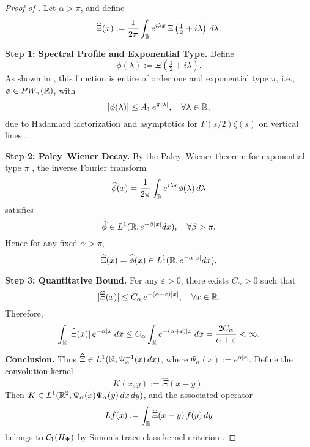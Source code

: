\begin{proof}[Proof of ]
Let \( \alpha > \pi \), and define
\[
\widehat{\Xi}(x) := \frac{1}{2\pi} \int_{\mathbb{R}} e^{i\lambda x} \, \Xi\left( \tfrac{1}{2} + i\lambda \right)\, d\lambda.
\]

\medskip
\noindent\textbf{Step 1: Spectral Profile and Exponential Type.}
Define
\[
\phi(\lambda) := \Xi\left( \tfrac{1}{2} + i\lambda \right).
\]
As shown in , this function is entire of order one and exponential type \( \pi \), i.e., \( \phi \in PW_\pi(\mathbb{R}) \), with
\[
|\phi(\lambda)| \le A_1\, e^{\pi |\lambda|}, \quad \forall \lambda \in \mathbb{R},
\]
due to Hadamard factorization and asymptotics for \( \Gamma(s/2)\zeta(s) \) on vertical lines \cite[Ch.~3]{Levin1996EntireLectures}, \cite[Ch.~2]{Titchmarsh1986Zeta}.

\medskip
\noindent\textbf{Step 2: Paley--Wiener Decay.}
By the Paley--Wiener theorem for exponential type \( \pi \) \cite[Thm.~3.2.4]{Levin1996EntireLectures}, the inverse Fourier transform
\[
\widehat{\phi}(x) = \frac{1}{2\pi} \int_{\mathbb{R}} e^{i\lambda x} \phi(\lambda)\, d\lambda
\]
satisfies
\[
\widehat{\phi} \in L^1(\mathbb{R}, e^{-\beta |x|} dx), \quad \forall \beta > \pi.
\]
Hence for any fixed \( \alpha > \pi \),
\[
\widehat{\Xi}(x) = \widehat{\phi}(x) \in L^1(\mathbb{R}, e^{-\alpha |x|} dx).
\]

\medskip
\noindent\textbf{Step 3: Quantitative Bound.}
For any \( \varepsilon > 0 \), there exists \( C_\alpha > 0 \) such that
\[
|\widehat{\Xi}(x)| \le C_\alpha\, e^{-(\alpha - \varepsilon)|x|}, \quad \forall x \in \mathbb{R}.
\]
Therefore,
\[
\int_{\mathbb{R}} |\widehat{\Xi}(x)|\, e^{-\alpha |x|} dx
\le C_\alpha \int_{\mathbb{R}} e^{-(\alpha + \varepsilon)|x|} dx
= \frac{2 C_\alpha}{\alpha + \varepsilon} < \infty.
\]

\medskip
\noindent\textbf{Conclusion.}
Thus \( \widehat{\Xi} \in L^1(\mathbb{R}, \Psi_\alpha^{-1}(x)\, dx) \), where \( \Psi_\alpha(x) := e^{\alpha |x|} \). Define the convolution kernel
\[
K(x,y) := \widehat{\Xi}(x - y).
\]
Then \( K \in L^1(\mathbb{R}^2, \Psi_\alpha(x)\Psi_\alpha(y)\, dx\,dy) \), and the associated operator
\[
L f(x) := \int_{\mathbb{R}} \widehat{\Xi}(x - y)\, f(y)\, dy
\]
belongs to \( \mathcal{C}_1(H_{\Psi}) \) by Simon’s trace-class kernel criterion \cite[Thm.~4.2]{Simon2005TraceIdeals}.
\end{proof}
